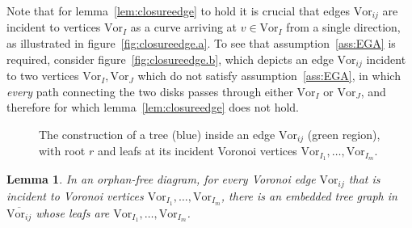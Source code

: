 \documentclass[11pt]{article}
\newtheorem{lemma}{Lemma}
\newcommand{\Vor}{\text{Vor}}
\begin{document}
Note that for lemma~\ref{lem:closureedge} to hold it is crucial that edges $\Vor_{ij}$ are incident to vertices $\Vor_I$ 
	as a curve arriving at $v\in\Vor_I$ from a single direction, 
	as illustrated in figure~\ref{fig:closureedge.a}.  
To see that assumption~\ref{ass:EGA} is required, 
	consider figure~\ref{fig:closureedge.b}, 
	which depicts an edge $\Vor_{ij}$ incident to two vertices $\Vor_I,\Vor_J$
	which do not satisfy assumption~\ref{ass:EGA}, 
	in which \emph{every} path connecting the two disks passes through either $\Vor_I$ or $\Vor_J$, 
	and therefore for which lemma~\ref{lem:closureedge} does not hold. 

	

\begin{figure}[htbp]
   \centering
	\quad
   \caption{The construction of a tree (blue) inside an edge $\Vor_{ij}$ (green region), with root $r$ and leafs 
   			at its incident Voronoi vertices $\Vor_{I_1},\dots,\Vor_{I_m}$.}
   \label{fig:tree}
\end{figure}


\begin{lemma}\label{lem:tree}
In an orphan-free diagram, 
	for every Voronoi edge $\Vor_{ij}$ that is incident to Voronoi vertices $\Vor_{I_1},\dots,\Vor_{I_m}$, 
	there is an embedded tree graph in $\overline{\Vor_{ij}}$ whose leafs are $\Vor_{I_1},\dots,\Vor_{I_m}$.
\end{lemma}
\end{document}
